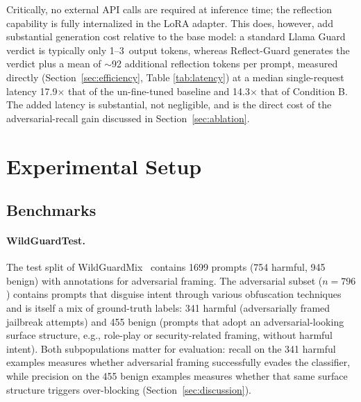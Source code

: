 \documentclass[superintelligence,article,accept,moreauthors]{Definitions/mdpi}
\renewcommand{\hl}[1]{#1}
\begin{document}
Critically, no external API calls are required at inference time; the reflection capability is fully internalized in the LoRA adapter. This does, however, add substantial generation cost relative to the base model: a standard Llama Guard verdict is typically only 1--3~output tokens, whereas Reflect-Guard generates the verdict plus a mean of $\sim$92 additional reflection tokens per prompt, measured directly (Section~\ref{sec:efficiency}, \hl{Table} %
 \ref{tab:latency}) at a median single-request latency 17.9$\times$ that of the un-fine-tuned baseline and 14.3$\times$ that of Condition B. The added latency is substantial, not negligible, and is the direct cost of the adversarial-recall gain discussed in Section~\ref{sec:ablation}.

\section{Experimental Setup}

\subsection{Benchmarks}
\label{sec:benchmarks}

\paragraph{\hl{WildGuardTest.} %
} The test split of WildGuardMix~\citep{han2024wildguard} contains 1699 prompts (754 harmful, 945 benign) with annotations for adversarial framing. The adversarial subset ($n = 796$) contains prompts that disguise intent through various obfuscation techniques and is itself a mix of ground-truth labels: 341 harmful (adversarially framed jailbreak attempts) and 455 benign (prompts that adopt an adversarial-looking surface structure, e.g., role-play or security-related framing, without harmful intent). Both subpopulations matter for evaluation: recall on the 341 harmful examples measures whether adversarial framing successfully evades the classifier, while precision on the 455 benign examples measures whether that same surface structure triggers over-blocking (Section~\ref{sec:discussion}).
\end{document}
